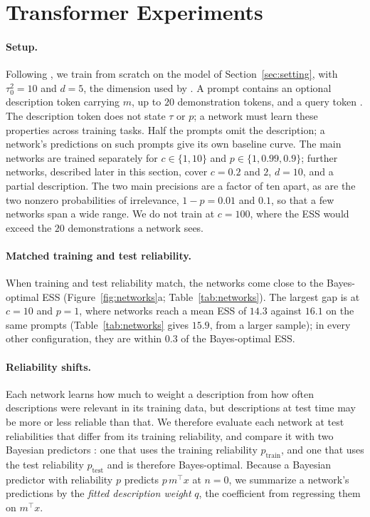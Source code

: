 \documentclass{article}
\theoremstyle{definition}
\begin{document}
\section{Transformer Experiments}\label{app:networks}

\paragraph{Setup.}
Following \citet{garg2022}, we train from scratch on the model of Section~\ref{sec:setting}, with $\tau_0^2=10$ and $d=5$, the dimension used by \citet{huangge2025}. A prompt contains an optional description token carrying $m$, up to $20$ demonstration tokens, and a query token \citep{huangge2025}. The description token does not state $\tau$ or $p$; a network must learn these properties across training tasks. Half the prompts omit the description; a network's predictions on such prompts give its own baseline curve. The main networks are trained separately for $c\in\{1,10\}$ and $p\in\{1,0.99,0.9\}$; further networks, described later in this section, cover $c=0.2$ and $2$, $d=10$, and a partial description. The two main precisions are a factor of ten apart, as are the two nonzero probabilities of irrelevance, $1-p=0.01$ and $0.1$, so that a few networks span a wide range. We do not train at $c=100$, where the ESS would exceed the $20$ demonstrations a network sees.


\paragraph{Matched training and test reliability.}
When training and test reliability match, the networks come close to the Bayes-optimal ESS (Figure~\ref{fig:networks}a; Table~\ref{tab:networks}). The largest gap is at $c=10$ and $p=1$, where networks reach a mean ESS of $14.3$ against $16.1$ on the same prompts (Table~\ref{tab:networks} gives $15.9$, from a larger sample); in every other configuration, they are within $0.3$ of the Bayes-optimal ESS.

\paragraph{Reliability shifts.}
Each network learns how much to weight a description from how often descriptions were relevant in its training data, but descriptions at test time may be more or less reliable than that. We therefore evaluate each network at test reliabilities that differ from its training reliability, and compare it with two Bayesian predictors \citep{raventos2023}: one that uses the training reliability $p_{\mathrm{train}}$, and one that uses the test reliability $p_{\mathrm{test}}$ and is therefore Bayes-optimal. Because a Bayesian predictor with reliability $p$ predicts $p\,m^\top x$ at $n=0$, we summarize a network's predictions by the \emph{fitted description weight} $q$, the coefficient from regressing them on $m^\top x$.
\end{document}
